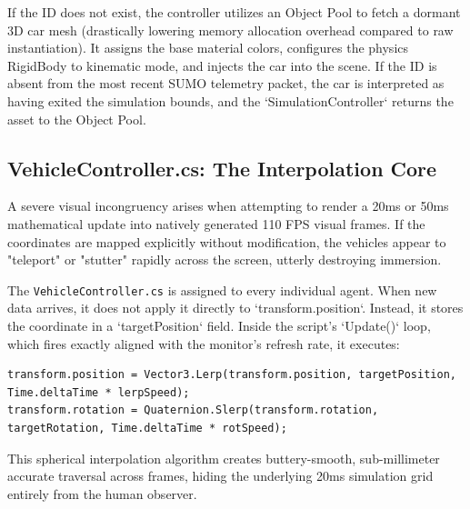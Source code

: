 If the ID does not exist, the controller utilizes an Object Pool to fetch a dormant 3D car mesh (drastically lowering memory allocation overhead compared to raw instantiation). It assigns the base material colors, configures the physics RigidBody to kinematic mode, and injects the car into the scene. If the ID is absent from the most recent SUMO telemetry packet, the car is interpreted as having exited the simulation bounds, and the `SimulationController` returns the asset to the Object Pool.

\subsection{VehicleController.cs: The Interpolation Core}

A severe visual incongruency arises when attempting to render a 20ms or 50ms mathematical update into natively generated 110 FPS visual frames. If the coordinates are mapped explicitly without modification, the vehicles appear to "teleport" or "stutter" rapidly across the screen, utterly destroying immersion.

The \texttt{VehicleController.cs} is assigned to every individual agent. When new data arrives, it does not apply it directly to `transform.position`. Instead, it stores the coordinate in a `targetPosition` field. Inside the script’s `Update()` loop, which fires exactly aligned with the monitor’s refresh rate, it executes:
\begin{lstlisting}
transform.position = Vector3.Lerp(transform.position, targetPosition, Time.deltaTime * lerpSpeed);
transform.rotation = Quaternion.Slerp(transform.rotation, targetRotation, Time.deltaTime * rotSpeed);
\end{lstlisting}

This spherical interpolation algorithm creates buttery-smooth, sub-millimeter accurate traversal across frames, hiding the underlying 20ms simulation grid entirely from the human observer.

